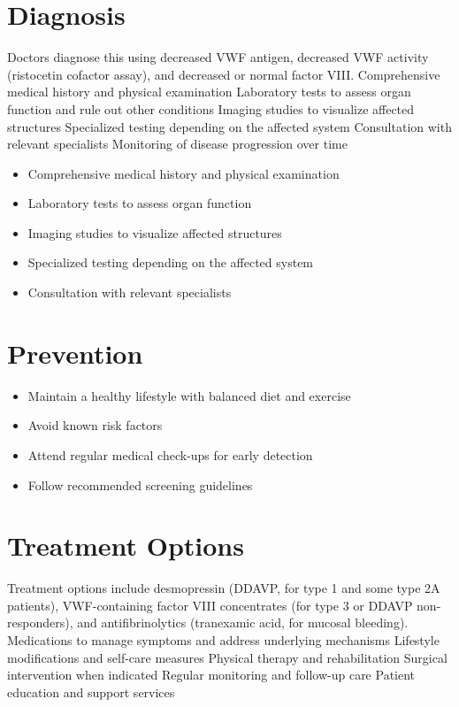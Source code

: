 \section{Diagnosis}
Doctors diagnose this using decreased VWF antigen, decreased VWF activity (ristocetin cofactor assay), and decreased or normal factor VIII. Comprehensive medical history and physical examination Laboratory tests to assess organ function and rule out other conditions Imaging studies to visualize affected structures Specialized testing depending on the affected system Consultation with relevant specialists Monitoring of disease progression over time

\begin{itemize}[noitemsep]
  \item Comprehensive medical history and physical examination
  \item Laboratory tests to assess organ function
  \item Imaging studies to visualize affected structures
  \item Specialized testing depending on the affected system
  \item Consultation with relevant specialists
\end{itemize}
\section{Prevention}
\begin{itemize}[noitemsep]
  \item Maintain a healthy lifestyle with balanced diet and exercise
  \item Avoid known risk factors
  \item Attend regular medical check-ups for early detection
  \item Follow recommended screening guidelines
\end{itemize}
\section{Treatment Options}
Treatment options include desmopressin (DDAVP, for type 1 and some type 2A patients), VWF-containing factor VIII concentrates (for type 3 or DDAVP non-responders), and antifibrinolytics (tranexamic acid, for mucosal bleeding). Medications to manage symptoms and address underlying mechanisms Lifestyle modifications and self-care measures Physical therapy and rehabilitation Surgical intervention when indicated Regular monitoring and follow-up care Patient education and support services

